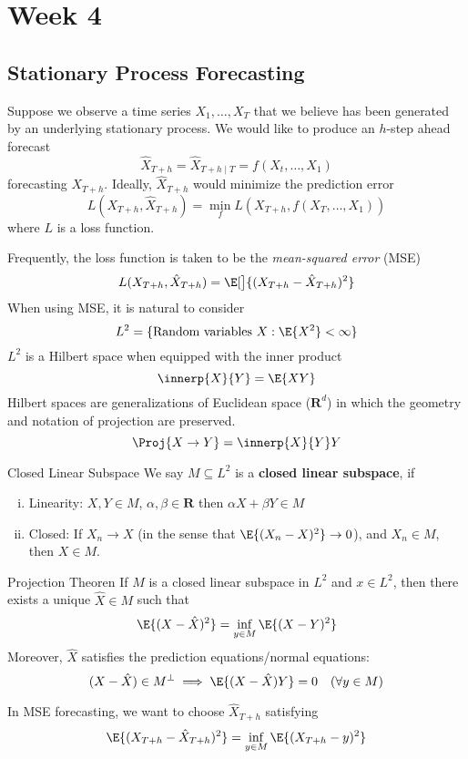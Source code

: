 \chapter{Week 4}
\section{Stationary Process Forecasting}
Suppose we observe a time series
$ X_1,\ldots,X_T $
that we believe has been generated by an underlying
stationary process. We would like to
produce an $ h $-step ahead
forecast
\[ \hat{X}_{T+h}=\hat{X}_{T+h\mid T}=f(X_t,\ldots,X_1) \]
forecasting $ X_{T+h} $. Ideally, $ \hat{X}_{T+h} $
would minimize the prediction error
\[ L(X_{T+h},\hat{X}_{T+h})=\min_f
    L(X_{T+h},f(X_{T},\ldots,X_1)) \]
where $ L $ is a loss function.

Frequently, the loss function is taken
to be the \emph{mean-squared error} (MSE)
\[ L(X_{T+h},\hat{X}_{T+h})=
    \E[\big]{(X_{T+h}-\hat{X}_{T+h})^2} \]
When using MSE, it is natural to consider
\[ L^2=\set{\text{Random variables } X: \E{X^2}<\infty} \]
$ L^2 $ is a Hilbert space when equipped
with the inner product
\[ \innerp{X}{Y}=\E{XY} \]
Hilbert spaces are generalizations of Euclidean space ($ \mathbf{R}^d $)
in which the geometry and notation of projection
are preserved.
\[ \Proj{X\to Y}=\innerp{X}{Y}Y \]
\begin{Definition}{Closed Linear Subspace}{}
    We say $ M\subseteq L^2 $
    is a \textbf{closed linear subspace}, if
    \begin{enumerate}[(i)]
        \item Linearity: $ X,Y\in M $, $ \alpha,\beta\in\mathbf{R} $
              then $ \alpha X+\beta Y\in M $
        \item Closed: If $ X_n\to X $ (in the sense that $ \E{(X_n-X)^2} \to 0 $),
              and $ X_n\in M $, then $ X\in M $.
    \end{enumerate}
\end{Definition}
\begin{Theorem}{Projection Theoren}{}
    If $ M $ is a closed linear subspace in $ L^2 $
    and $ x\in L^2 $, then there exists a
    unique $ \hat{X}\in M $ such that
    \[ \E{(X-\hat{X})^2}=\inf_{y\in M}\E{(X-Y)^2} \]
    Moreover, $ \hat{X} $ satisfies the prediction equations/normal
    equations:
    \[ (X-\hat{X})\in M^\perp \implies \E{(X-\hat{X})Y}=0\quad (\forall y\in M) \]
\end{Theorem}
In MSE forecasting, we want to choose
$ \hat{X}_{T+h} $ satisfying
\[ \E{(X_{T+h}-\hat{X}_{T+h})^2}=\inf_{y\in M}\E{(X_{T+h}-y)^2} \]
